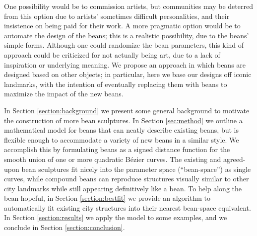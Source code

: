 \documentclass[%
reprint,
twocolumn,
nofootinbib,
 amsmath,amssymb,
 aps,
]{revtex4-2}
\begin{document}
One possibility would be to commission artists, but communities may be deterred from this option due to artists' sometimes difficult personalities, and their insistence on being paid for their work. A more pragmatic option would be to automate the design of the beans; this is a realistic possibility, due to the beans' simple forms. Although one could randomize the bean parameters, this kind of approach could be criticized for not actually being art, due to a lack of inspiration or underlying meaning. We propose an approach in which beans are designed based on other objects; in particular, here we base our designs off iconic landmarks, with the intention of eventually replacing them with beans to maximize the impact of the new beans.

In Section \ref{section:background} we present some general background to motivate the construction of more bean sculptures. In Section \ref{sec:method} we outline a mathematical model for beans that can neatly describe existing beans, but is flexible enough to accommodate a variety of new beans in a similar style. We accomplish this by formulating beans as a signed distance function for the smooth union of one or more quadratic B\'ezier curves. The existing and agreed-upon bean sculptures fit nicely into the parameter space (``bean-space'') as single curves, while compound beans can reproduce structures visually similar to other city landmarks while still appearing definitively like a bean. To help along the bean-hopeful, in Section \ref{section:bestfit} we provide an algorithm to automatically fit existing city structures into their nearest bean-space equivalent. In Section \ref{section:results} we apply the model to some examples, and we conclude in Section \ref{section:conclusion}.




\end{document}
